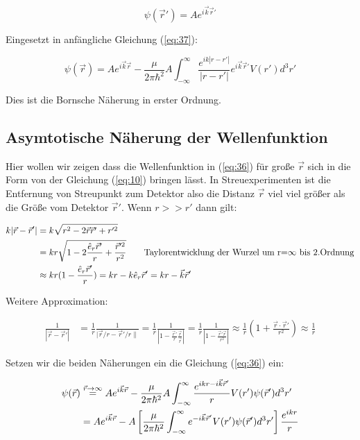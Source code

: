 \begin{equation}
  \label{eq:40}
   \psi(\vec r') =  Ae^{i\vec k \vec r'}
\end{equation}

Eingesetzt in anfängliche Gleichung (\ref{eq:37}):

\begin{equation}
  \label{eq:41}
   \psi(\vec r) =  Ae^{i\vec k \vec r}  -\frac{\mu}{2\pi\hbar^2}A \int_{-\infty}^\infty \frac{ e^{ik |r-r'| }}{|r-r'|  }e^{i\vec k \vec r'}  V(r')   d^3 r'
\end{equation}


Dies ist die Bornsche Näherung in erster Ordnung. 


\subsection*{Asymtotische Näherung der Wellenfunktion}

Hier wollen wir zeigen dass die Wellenfunktion in (\ref{eq:36}) für große \(\vec r\) sich in die Form von der Gleichung (\ref{eq:10}) bringen lässt. In Streuexperimenten ist die Entfernung von Streupunkt zum Detektor also die Distanz \(\vec r\) viel viel größer als die Größe vom Detektor \(\vec r'\).  Wenn \(r>> r'\) dann gilt:

\begin{align}
  \label{eq:42}
  k|\vec r - \vec r'| &= k\sqrt{ r^2-2\vec r\vec r' + r'^2 }\notag \\
 &= kr\sqrt{ 1-2\frac{\hat e_r\vec r'}{r} + \frac{\vec r'^2}{r^2} } \qquad \text{Taylorentwicklung der Wurzel um r=}\infty\text{ bis 2.Ordnung}\notag\\ 
 &\approx kr(1-\frac{\hat e_r\vec r'}{r}) = kr - k\hat e_r\vec r'= kr- \vec k\vec r'
\end{align}


Weitere Approximation:


\begin{align}
  \label{eq:43}
  \frac{1}{|\vec r - \vec r'| } &= \frac{1}{r}\frac{1}{|\vec r/r- \vec r'/r\|} = \frac{1}{r}\frac{1}{|1 -  \frac{\vec r'}{r} \frac{\vec r}{\vec r}|} = \frac{1}{r}\frac{1}{|1 -  \frac{\vec r'\vec r}{r^2} |} \approx \frac{1}{r}\left(1+\frac{\vec r\cdot\vec r'}{r^2}\right) \approx \frac{1}{r} 
\end{align}

Setzen wir die beiden Näherungen ein die Gleichung (\ref{eq:36}) ein:


\begin{align}
  \label{eq:44}
   \psi(\vec r) &\stackrel{\vec r\to \infty}=  Ae^{i\vec k \vec r}  -\frac{\mu}{2\pi\hbar^2}A \int_{-\infty}^\infty \frac{ e^{i kr - i\vec k\vec r'  }}{r} V(r')\psi(\vec r')   d^3 r'\notag \\
&=  Ae^{i\vec k \vec r}  - A\left[\frac{\mu}{2\pi\hbar^2}\int_{-\infty}^\infty e^{- i\vec k\vec r' }  V(r') \psi(\vec r') d^3 r'\right] \frac{ e^{i kr }}{r} 
\end{align}


